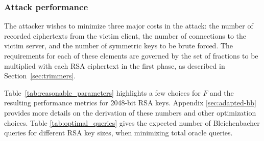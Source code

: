 \newcommand{\GPUTable}{
\begin{table*}[t]
 \centering
 \begin{tabular}{llrrrr}
        \toprule
        \textbf{Platform} & \textbf{Hardware} & \textbf{Cost} & \textbf{Full attack}  & \textbf{Cost to perform attack in 1 day} \\
        \midrule
        Na\"{\i}ve CPU & 4 Intel Xeon E7-4820 & $\$21,400$ & $114$ days  & \$$2,440,000$\\
        Na\"{\i}ve GPU & ZOTAC GeForce GTX TITAN & $\$2,400$  & $189$ days & \$$450,000$ \\
        Na\"{\i}ve FPGA & 64 Spartan-6 LX150 & $\$60,000$ & $51.5$ days  & \$$3,090,000$  \\
        \cmidrule{1-5}
        Optimized Hashcat & NVIDIA GTX / AMD R9 & \$18,040 & $0.75$ days & \$13,500 \\
        Optimized EC2 & NVIDIA & \$440 & $0.33$ days & \$147 \\
        \bottomrule
  \end{tabular}	
\caption{\textbf{Time and cost efficiency of our attack on different hardware platforms.} The brute force attacks against symmetric export keys are the most expensive part of our attack.  We compared the performance of a na\"{\i}ve implementation of our attack on different platforms, and decided that a GPU implementation held the most promise.  We then heavily optimized our GPU implementation, obtaining several orders of magnitude in speedup.}
\label{perf_comparison}
\end{table*}
}

\subsubsection{Attack performance}
The attacker wishes to minimize three major costs in the attack: the number of recorded ciphertexts from the victim client, the number of connections to the victim server, and the number of symmetric keys to be brute forced.
The requirements for each of these elements are governed by the set of fractions to be multiplied with each RSA ciphertext in the first phase, as described in Section~\ref{sec:trimmers}.

Table~\ref{tab:reasonable_parameters} highlights a few choices for $F$ and the resulting performance metrics for 2048-bit RSA keys.
Appendix \ref{sec:adapted-bb} provides more details on the derivation of these numbers and other optimization choices.
Table \ref{tab:optimal_queries} gives the expected number of Bleichenbacher queries for different RSA key sizes, when minimizing total oracle queries.








